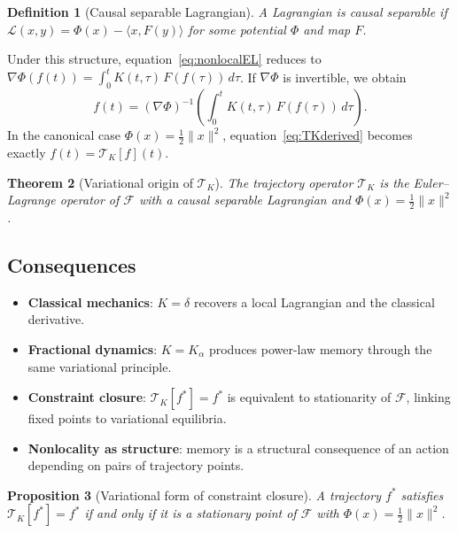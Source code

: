 \documentclass[12pt]{article}
\newtheorem{theorem}{Theorem}[section]
\newtheorem{proposition}[theorem]{Proposition}
\newtheorem{definition}[theorem]{Definition}
\newcommand{\TK}{\mathcal{T}_K}
\begin{document}
\begin{definition}[Causal separable Lagrangian]
A Lagrangian is \emph{causal separable} if
$\mathcal{L}(x,y) = \Phi(x) - \langle x, F(y)\rangle$
for some potential $\Phi$ and map $F$.
\end{definition}

Under this structure, equation~\eqref{eq:nonlocalEL} reduces to
$\nabla\Phi(f(t)) = \int_0^t K(t,\tau)\,F(f(\tau))\,d\tau$.
If $\nabla\Phi$ is invertible, we obtain
\begin{equation}
\label{eq:TKderived}
  f(t) = (\nabla\Phi)^{-1}\!\left(\int_0^t K(t,\tau)\,F(f(\tau))\,d\tau\right).
\end{equation}
In the canonical case $\Phi(x) = \tfrac{1}{2}\|x\|^2$,
equation~\eqref{eq:TKderived} becomes exactly $f(t) = \TK[f](t)$.

\begin{theorem}[Variational origin of $\TK$]
\label{thm:variational}
The trajectory operator $\TK$ is the Euler--Lagrange operator of
$\mathcal{F}$ with a causal separable Lagrangian and
$\Phi(x) = \tfrac{1}{2}\|x\|^2$.
\end{theorem}

\subsection{Consequences}

\begin{itemize}
  \item \textbf{Classical mechanics}: $K = \delta$ recovers a local
    Lagrangian and the classical derivative.
  \item \textbf{Fractional dynamics}: $K = K_\alpha$ produces power-law
    memory through the same variational principle.
  \item \textbf{Constraint closure}: $\TK[f^*] = f^*$ is equivalent to
    stationarity of $\mathcal{F}$, linking fixed points to variational
    equilibria.
  \item \textbf{Nonlocality as structure}: memory is a structural
    consequence of an action depending on pairs of trajectory points.
\end{itemize}

\begin{proposition}[Variational form of constraint closure]
\label{prop:var_closure}
A trajectory $f^*$ satisfies $\TK[f^*] = f^*$ if and only if it is a
stationary point of $\mathcal{F}$ with $\Phi(x) = \tfrac{1}{2}\|x\|^2$.
\end{proposition}
\end{document}
